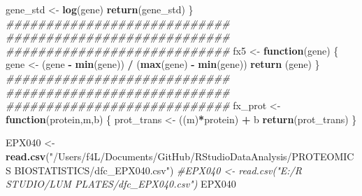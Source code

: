 \documentclass[]{article}
\newenvironment{Shaded}{\begin{snugshade}}{\end{snugshade}}
\newcommand{\CommentTok}[1]{\textcolor[rgb]{0.56,0.35,0.01}{\textit{#1}}}
\newcommand{\ControlFlowTok}[1]{\textcolor[rgb]{0.13,0.29,0.53}{\textbf{#1}}}
\newcommand{\KeywordTok}[1]{\textcolor[rgb]{0.13,0.29,0.53}{\textbf{#1}}}
\newcommand{\NormalTok}[1]{#1}
\newcommand{\OperatorTok}[1]{\textcolor[rgb]{0.81,0.36,0.00}{\textbf{#1}}}
\newcommand{\StringTok}[1]{\textcolor[rgb]{0.31,0.60,0.02}{#1}}
\begin{document}
\begin{Shaded}
\begin{Highlighting}[]
\NormalTok{  gene_std <-}\StringTok{ }\KeywordTok{log}\NormalTok{(gene)}
  \KeywordTok{return}\NormalTok{(gene_std)}
\NormalTok{\}}
\CommentTok{############################}
\CommentTok{############################}
\CommentTok{############################}
\NormalTok{fx5 <-}\StringTok{ }\ControlFlowTok{function}\NormalTok{(gene) \{ }
\NormalTok{  gene <-}\StringTok{ }\NormalTok{(gene }\OperatorTok{-}\StringTok{ }\KeywordTok{min}\NormalTok{(gene)) }\OperatorTok{/}\StringTok{ }\NormalTok{(}\KeywordTok{max}\NormalTok{(gene) }\OperatorTok{-}\StringTok{ }\KeywordTok{min}\NormalTok{(gene))}
  \KeywordTok{return}\NormalTok{ (gene) }
\NormalTok{\}}
\CommentTok{############################}
\CommentTok{############################}
\CommentTok{############################}
\NormalTok{fx_prot <-}\StringTok{ }\ControlFlowTok{function}\NormalTok{(protein,m,b) \{}
\NormalTok{  prot_trans <-}\StringTok{ }\NormalTok{((m)}\OperatorTok{*}\NormalTok{protein) }\OperatorTok{+}\StringTok{ }\NormalTok{b}
  \KeywordTok{return}\NormalTok{(prot_trans)}
\NormalTok{\}}
\end{Highlighting}
\end{Shaded}

\begin{Shaded}
\begin{Highlighting}[]
\NormalTok{EPX040 <-}\StringTok{ }\KeywordTok{read.csv}\NormalTok{(}\StringTok{"/Users/f4L/Documents/GitHub/RStudioDataAnalysis/PROTEOMICS BIOSTATISTICS/dfc_EPX040.csv"}\NormalTok{)}
\CommentTok{#EPX040 <- read.csv("E:/R STUDIO/LUM PLATES/dfc_EPX040.csv")}
\NormalTok{EPX040}
\end{Highlighting}
\end{Shaded}
\end{document}
